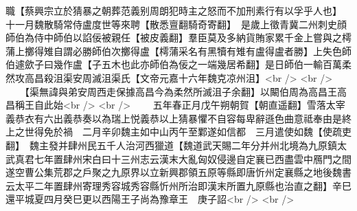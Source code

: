 職【蔡興宗立於猜暴之朝葬范義别周朗犯時主之怒而不加刑素行有以孚乎人也】　十一月魏散騎常侍盧度世等來聘【散悉亶翻騎奇寄翻】　是歲上徵青冀二州刺史顔師伯為侍中師伯以諂佞被親任【被皮義翻】羣臣莫及多納貨賄家累千金上嘗與之樗蒲上擲得雉自謂必勝師伯次擲得盧【樗蒲采名有黑犢有雉有盧得盧者勝】上失色師伯遽歛子曰幾作盧【子五木也此亦師伯為佞之一端幾居希翻】是日師伯一輸百萬柔然攻高昌殺沮渠安周滅沮渠氏【文帝元嘉十六年魏克凉州沮】<br />
<br />
　　【渠無諱與弟安周西走保據高昌今為柔然所滅沮子余翻】以闞伯周為高昌王高昌稱王自此始<br />
<br />
　　五年春正月戊午朔朝賀【朝直遥翻】雪落太宰義恭衣有六出義恭奏以為瑞上悦義恭以上猜暴懼不自容每卑辭遜色曲意祗奉由是終上之世得免於禍　二月辛卯魏主如中山丙午至鄴遂如信都　三月遣使如魏【使疏吏翻】　魏主發并肆州民五千人治河西獵道【魏道武天賜二年分并州北境為九原鎮太武真君七年置肆州宋白曰十三州志云漢末大亂匈奴侵邊自定襄已西盡雲中鴈門之間遂空曹公集荒郡之戶聚之九原界以立新興郡領五原等縣即唐忻州定襄縣之地後魏書云太平二年置肆州寄理秀容城秀容縣忻州所治即漢末所置九原縣也治直之翻】辛巳還平城夏四月癸巳更以西陽王子尚為豫章王　庚子詔<br />
<br />
